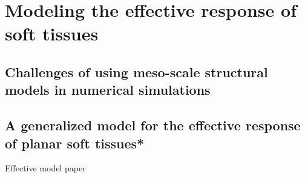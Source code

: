 \chapter{Modeling the effective response of soft tissues}

\section{Challenges of using meso-scale structural models in numerical simulations}
\section{A generalized model for the effective response of planar soft tissues*}

Effective model paper